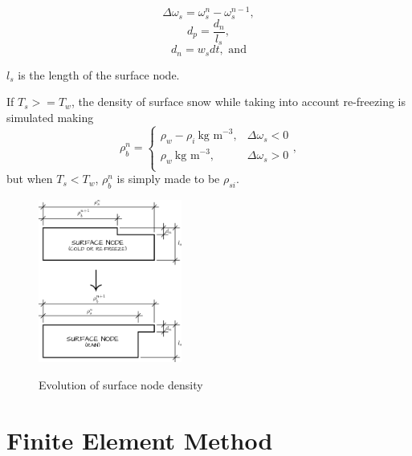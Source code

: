 \documentclass{article}%
\begin{document}
  $$\Delta \omega_s = \omega_s^{n} - \omega_s^{n-1},$$ 
  $$d_p = \frac{d_n}{l_s},$$
  $$d_n = w_sdt,\text{ and}$$
  \begin{center}$l_s$ is the length of the surface node.\end{center}
If $T_s >= T_w$, the density of surface snow while taking into account re-freezing is simulated making
  $$
  \rho_{\dot{b}}^n = 
  \begin{cases}
    \rho_w - \rho_i\ \text{kg m}^{-3},  &\Delta\omega_s < 0\\
    \rho_w\ \text{kg m}^{-3}, &\Delta\omega_s > 0\\
  \end{cases},
  $$
but when $T_s < T_w$, $\rho_{\dot{b}}^n$ is simply made to be $\rho_{si}$.
\begin{figure}[H]
	\centering
		\includegraphics[width=0.42\textwidth]{images/surfaceDensity.png}
	\label{fig:500 year orbit}
	\caption{Evolution of surface node density}
\end{figure}

\section{Finite Element Method}
\end{document}
